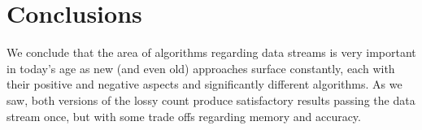 \documentclass[...]{revdetua}
\begin{document}
\section{Conclusions}
We conclude that the area of algorithms regarding data streams is very important in today's age as new (and even old) approaches surface constantly, each with their positive and negative aspects and significantly different algorithms. As we saw, both versions of the lossy count produce satisfactory results passing the data stream once, but with some trade offs regarding memory and accuracy.


\end{document}
